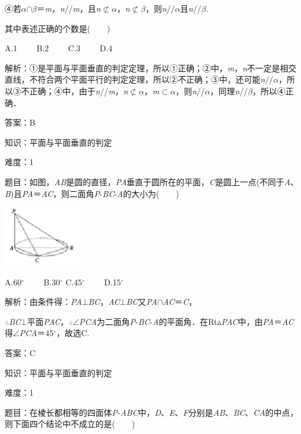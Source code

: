\documentclass{article} %
\begin{document}
④若\textit{$\alpha$}$\mathrm{\cap}$\textit{$\beta$}＝\textit{m}，\textit{n}//\textit{m}，且\textit{n}$\mathrm{\nsubset}$\textit{$\alpha$}，\textit{n}$\mathrm{\nsubset}$\textit{$\beta$}，则\textit{n}//\textit{$\alpha$}且\textit{n}//\textit{$\beta$}.

其中表述正确的个数是(　　)

A.1　　 B.2　　 C.3　　 D.4

解析：①是平面与平面垂直的判定定理，所以①正确；②中，\textit{m}，\textit{n}不一定是相交直线，不符合两个平面平行的判定定理，所以②不正确；③中，还可能\textit{n}//\textit{$\alpha$}，所以③不正确；④中，由于\textit{n}//\textit{m}，\textit{n}$\mathrm{\nsubset}$\textit{$\alpha$}，\textit{m}$\mathrm{\subset }$\textit{$\alpha$}，则\textit{n}//\textit{$\alpha$}，同理\textit{n}//\textit{$\beta$}，所以④正确．

答案：B

知识：平面与平面垂直的判定

难度：1

题目：如图，\textit{AB}是圆的直径，\textit{PA}垂直于圆所在的平面，\textit{C}是圆上一点(不同于\textit{A}、\textit{B})且\textit{PA}＝\textit{AC}，则二面角\textit{P}-\textit{BC}-\textit{A}的大小为(　　)

\includegraphics*[width=1.29in, height=1.02in, keepaspectratio=false]{image210}

A.60$\mathrm{{}^\circ}$　　 B.30$\mathrm{{}^\circ}$  C.45$\mathrm{{}^\circ}$　　 D.15$\mathrm{{}^\circ}$

解析：由条件得：\textit{PA}$\mathrm{\bot}$\textit{BC}，\textit{AC}$\mathrm{\bot}$\textit{BC}又\textit{PA}$\mathrm{\cap}$\textit{AC}＝\textit{C}，

$\mathrm{\therefore}$\textit{BC}$\mathrm{\bot}$平面\textit{PAC}，$\mathrm{\therefore}$$\mathrm{\angle}$\textit{PCA}为二面角\textit{P}-\textit{BC}-\textit{A}的平面角．在Rt$\mathrm{\vartriangle}$\textit{PAC}中，由\textit{PA}＝\textit{AC}得$\mathrm{\angle}$\textit{PCA}＝45$\mathrm{{}^\circ}$，故选C.

答案：C

知识：平面与平面垂直的判定

难度：1

题目：在棱长都相等的四面体\textit{P}-\textit{ABC}中，\textit{D}、\textit{E}、\textit{F}分别是\textit{AB}、\textit{BC}、\textit{CA}的中点，则下面四个结论中不成立的是(　　)
\end{document}
